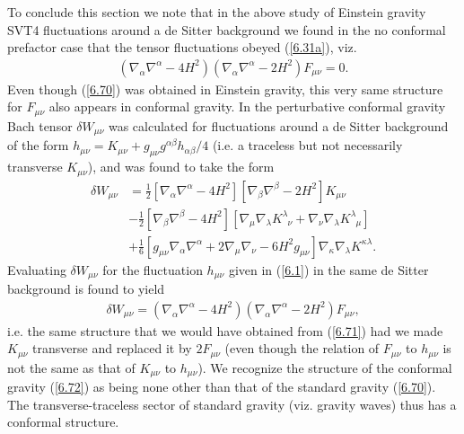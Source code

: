 To conclude this section we note that in the above study of Einstein gravity SVT4 fluctuations around a de Sitter background we found in the no conformal prefactor case that the tensor fluctuations obeyed (\ref{6.31a}), viz.  
%
\begin{eqnarray}
(\nabla_{\alpha}\nabla^{\alpha}-4H^2)(\nabla_{\alpha}\nabla^{\alpha}-2H^2)F_{\mu\nu}=0.
\label{6.70}
\end{eqnarray}
%
Even though (\ref{6.70}) was obtained in Einstein gravity, this very same structure for $F_{\mu\nu}$ also appears in conformal gravity. In \cite{mannheim_2012}  the perturbative conformal gravity Bach tensor $\delta W_{\mu\nu}$ was calculated for fluctuations around a de Sitter background of the form $h_{\mu\nu}=K_{\mu\nu}+g_{\mu\nu}g^{\alpha\beta}h_{\alpha\beta}/4$ (i.e. a traceless but not necessarily transverse $K_{\mu\nu}$), and was found to take the  form
%
\begin{align}
\delta W_{\mu\nu}&=\frac{1}{2}[\nabla_{\alpha}\nabla^{\alpha}-4H^2][\nabla_{\beta}\nabla^{\beta}-2H^2]K_{\mu\nu}
\nonumber\\
&
-\frac{1}{2}[\nabla_{\beta}\nabla^{\beta}-4H^2][
\nabla_{\mu}\nabla_{\lambda}K^{\lambda}_{\phantom{\lambda}\nu}
+\nabla_{\nu}\nabla_{\lambda}K^{\lambda}_{\phantom{\lambda}\mu}]
\nonumber\\
&+\frac{1}{6}[g_{\mu\nu}\nabla_{\alpha}\nabla^{\alpha}+2\nabla_{\mu}\nabla_{\nu}
-6H^2g_{\mu\nu}]\nabla_{\kappa}\nabla_{\lambda}K^{\kappa\lambda}.
\label{6.71}
\end{align}
%
Evaluating $\delta W_{\mu\nu}$ for the fluctuation $h_{\mu\nu}$ given in (\ref{6.1}) in the same de Sitter background is found to yield 
%
\begin{eqnarray}
\delta W_{\mu\nu}= (\nabla_{\alpha}\nabla^{\alpha}-4H^2)(\nabla_{\alpha}\nabla^{\alpha}-2H^2)F_{\mu\nu},
\label{6.72}
\end{eqnarray}
%
i.e. the same structure that we would have obtained from (\ref{6.71}) had we made $K_{\mu\nu}$ transverse and replaced it by $2F_{\mu\nu}$ (even though the relation of $F_{\mu\nu}$ to  $h_{\mu\nu}$ is not the same as that of $K_{\mu\nu}$ to $h_{\mu\nu}$). We recognize the structure of the conformal gravity (\ref{6.72}) as being none other than that of the standard gravity (\ref{6.70}). The transverse-traceless sector of standard gravity (viz. gravity waves) thus has a conformal structure.


